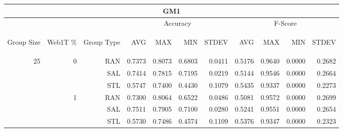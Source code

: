 \begin{center}
\begin{table}[htbp] 
 \begin{center}
\begin{tabular}{ | r | r | r | r | r | r | r | r | r | r | r |}
\hline
\multicolumn{11}{|c|}{GM1}\\
\hline
 & & & \multicolumn{4}{|c|}{Accuracy} & \multicolumn{4}{|c|}{F-Score}\\ \cline{4-11}
\begin{sideways}Group Size\end{sideways} & \begin{sideways}Web1T \%\end{sideways} & \begin{sideways}Group Type\end{sideways} & \begin{sideways}AVG\end{sideways} & \begin{sideways}MAX\end{sideways} & \begin{sideways}MIN\end{sideways} & \begin{sideways}STDEV\end{sideways} & \begin{sideways}AVG\end{sideways} & \begin{sideways}MAX\end{sideways} & \begin{sideways}MIN\end{sideways} & \begin{sideways}STDEV\end{sideways}\\
\hline
\multirow{18}{*}{25}
 & \multirow{3}{*}{0} & RAN & 0.7373 & 0.8073 & 0.6803 & 0.0411 & 0.5176 & 0.9640 & 0.0000 & 0.2682\\ \cline{3-11}
 &   & SAL & 0.7414 & 0.7815 & 0.7195 & 0.0219 & 0.5144 & 0.9546 & 0.0000 & 0.2664\\ \cline{3-11}
 &   & STL & 0.5747 & 0.7400 & 0.4430 & 0.1079 & 0.5435 & 0.9337 & 0.0000 & 0.2273\\ \cline{2-11}
 & \multirow{3}{*}{1} & RAN & 0.7300 & 0.8064 & 0.6522 & 0.0486 & 0.5081 & 0.9572 & 0.0000 & 0.2699\\ \cline{3-11}
 &   & SAL & 0.7511 & 0.7905 & 0.7100 & 0.0280 & 0.5241 & 0.9551 & 0.0000 & 0.2654\\ \cline{3-11}
 &   & STL & 0.5730 & 0.7486 & 0.4574 & 0.1109 & 0.5376 & 0.9347 & 0.0000 & 0.2323\\ \cline{2-11}

\end{tabular}
\end{center}
\end{table}
\end{center}

